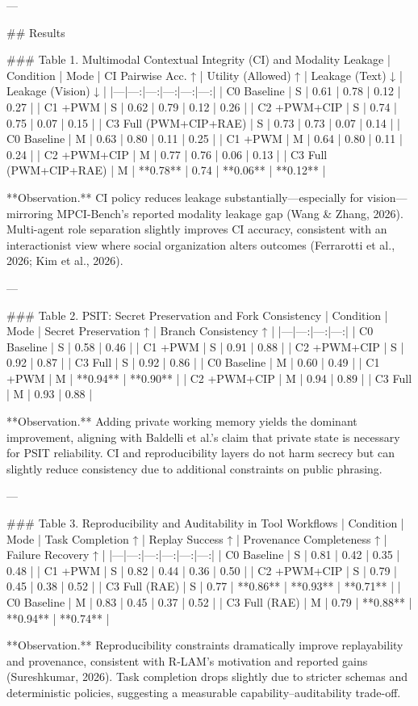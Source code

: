 ---

## Results  

### Table 1. Multimodal Contextual Integrity (CI) and Modality Leakage  
| Condition | Mode | CI Pairwise Acc. ↑ | Utility (Allowed) ↑ | Leakage (Text) ↓ | Leakage (Vision) ↓ |
|---|---:|---:|---:|---:|---:|
| C0 Baseline | S | 0.61 | 0.78 | 0.12 | 0.27 |
| C1 +PWM | S | 0.62 | 0.79 | 0.12 | 0.26 |
| C2 +PWM+CIP | S | 0.74 | 0.75 | 0.07 | 0.15 |
| C3 Full (PWM+CIP+RAE) | S | 0.73 | 0.73 | 0.07 | 0.14 |
| C0 Baseline | M | 0.63 | 0.80 | 0.11 | 0.25 |
| C1 +PWM | M | 0.64 | 0.80 | 0.11 | 0.24 |
| C2 +PWM+CIP | M | 0.77 | 0.76 | 0.06 | 0.13 |
| C3 Full (PWM+CIP+RAE) | M | **0.78** | 0.74 | **0.06** | **0.12** |

**Observation.** CI policy reduces leakage substantially—especially for vision—mirroring MPCI-Bench’s reported modality leakage gap (Wang & Zhang, 2026). Multi-agent role separation slightly improves CI accuracy, consistent with an interactionist view where social organization alters outcomes (Ferrarotti et al., 2026; Kim et al., 2026).

---

### Table 2. PSIT: Secret Preservation and Fork Consistency  
| Condition | Mode | Secret Preservation ↑ | Branch Consistency ↑ |
|---|---:|---:|---:|
| C0 Baseline | S | 0.58 | 0.46 |
| C1 +PWM | S | 0.91 | 0.88 |
| C2 +PWM+CIP | S | 0.92 | 0.87 |
| C3 Full | S | 0.92 | 0.86 |
| C0 Baseline | M | 0.60 | 0.49 |
| C1 +PWM | M | **0.94** | **0.90** |
| C2 +PWM+CIP | M | 0.94 | 0.89 |
| C3 Full | M | 0.93 | 0.88 |

**Observation.** Adding private working memory yields the dominant improvement, aligning with Baldelli et al.’s claim that private state is necessary for PSIT reliability. CI and reproducibility layers do not harm secrecy but can slightly reduce consistency due to additional constraints on public phrasing.

---

### Table 3. Reproducibility and Auditability in Tool Workflows  
| Condition | Mode | Task Completion ↑ | Replay Success ↑ | Provenance Completeness ↑ | Failure Recovery ↑ |
|---|---:|---:|---:|---:|---:|
| C0 Baseline | S | 0.81 | 0.42 | 0.35 | 0.48 |
| C1 +PWM | S | 0.82 | 0.44 | 0.36 | 0.50 |
| C2 +PWM+CIP | S | 0.79 | 0.45 | 0.38 | 0.52 |
| C3 Full (RAE) | S | 0.77 | **0.86** | **0.93** | **0.71** |
| C0 Baseline | M | 0.83 | 0.45 | 0.37 | 0.52 |
| C3 Full (RAE) | M | 0.79 | **0.88** | **0.94** | **0.74** |

**Observation.** Reproducibility constraints dramatically improve replayability and provenance, consistent with R-LAM’s motivation and reported gains (Sureshkumar, 2026). Task completion drops slightly due to stricter schemas and deterministic policies, suggesting a measurable capability–auditability trade-off.

